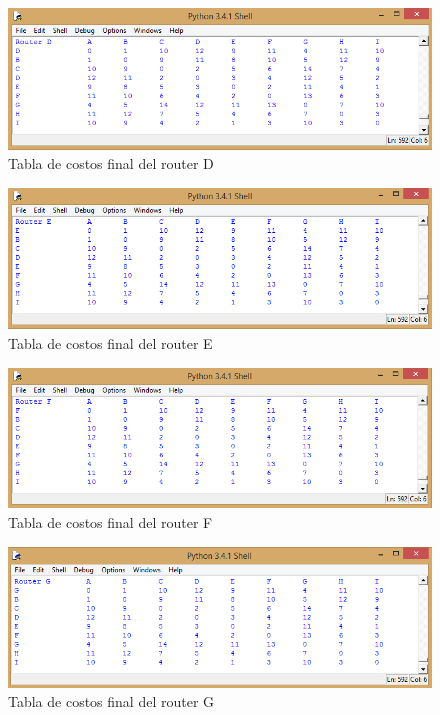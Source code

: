 \documentclass{article}
\begin{document}
\begin{figure}[H]
\centering
\includegraphics[width=\textwidth]{p24.png}
\caption{Tabla de costos final del router D}
\label{fig:Tabla de costos}
\end{figure}

\begin{figure}[H]
\centering
\includegraphics[width=\textwidth]{p25.png}
\caption{Tabla de costos final del router E}
\label{fig:Tabla de costos}
\end{figure}

\begin{figure}[H]
\centering
\includegraphics[width=\textwidth]{p26.png}
\caption{Tabla de costos final del router F}
\label{fig:Tabla de costos}
\end{figure}

\begin{figure}[H]
\centering
\includegraphics[width=\textwidth]{p27.png}
\caption{Tabla de costos final del router G}
\label{fig:Tabla de costos}
\end{figure}
\end{document}
